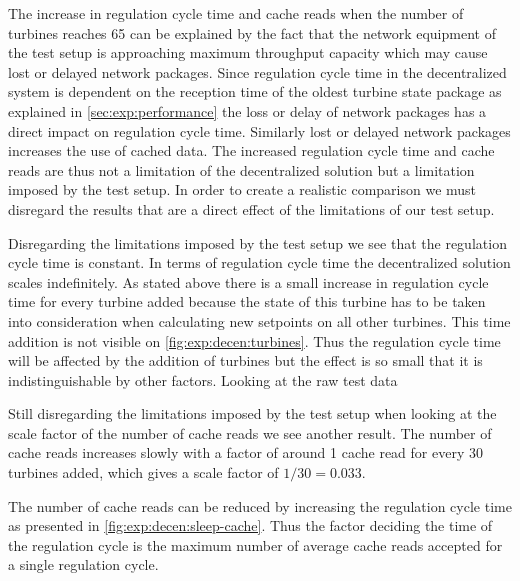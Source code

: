 The increase in regulation cycle time and cache reads when the number of turbines reaches 65 can be explained by the fact that the network equipment of the test setup is approaching maximum throughput capacity which may cause lost or delayed network packages.
Since regulation cycle time in the decentralized system is dependent on the reception time of the oldest turbine state package as explained in \cref{sec:exp:performance} the loss or delay of network packages has a direct impact on regulation cycle time.
Similarly lost or delayed network packages increases the use of cached data. The increased regulation cycle time and cache reads are thus not a limitation of the decentralized solution but a limitation imposed by the test setup. In order to create a realistic comparison we must disregard the results that are a direct effect of the limitations of our test setup.

Disregarding the limitations imposed by the test setup we see that the regulation cycle time is constant. In terms of regulation cycle time the decentralized solution scales indefinitely. As stated above there is a small increase in regulation cycle time for every turbine added because the state of this turbine has to be taken into consideration when calculating new setpoints on all other turbines. This time addition is not visible on \cref{fig:exp:decen:turbines}. Thus the regulation cycle time will be affected by the addition of turbines but the effect is so small that it is indistinguishable by other factors. Looking at the raw test data 

Still disregarding the limitations imposed by the test setup when looking at the scale factor of the number of cache reads we see another result. The number of cache reads increases slowly with a factor of around 1 cache read for every 30 turbines added, which gives a scale factor of $1 / 30 = 0.033$.

The number of cache reads can be reduced by increasing the regulation cycle time as presented in \cref{fig:exp:decen:sleep-cache}.
Thus the factor deciding the time of the regulation cycle is the maximum number of average cache reads accepted for a single regulation cycle.
